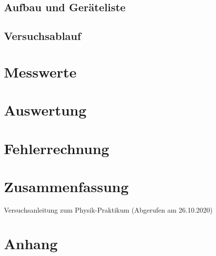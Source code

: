 \documentclass[a4paper,12pt,bibtotocnumbered]{scrartcl}
\numberwithin{equation}{section} %
\begin{document}
\subsection{Aufbau und Geräteliste}

\subsection{Versuchsablauf}

\section[Messwerte]{Messwerte}
\section[Auswertung]{Auswertung}
\section[Fehlerrechnung]{Fehlerrechnung}
\section[Zusammenfassung]{Zusammenfassung}
\begin{thebibliography}{999}
 Versuchsanleitung zum Physik-Praktikum (Abgerufen am 26.10.2020) 
\end{thebibliography}


\section{Anhang}

\end{document}

